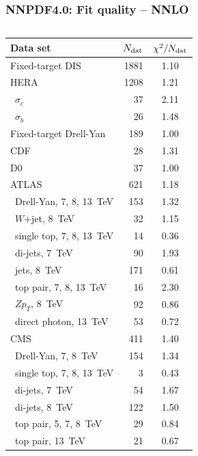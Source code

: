 \documentclass{beamer}
\begin{document}
\begin{frame}
 \frametitle{NNPDF4.0: Fit quality -- NNLO}
 \footnotesize
 \centering
 \begin{columns}[c]
  \begin{column}{0.5\textwidth}
  \tiny
  \renewcommand*{\arraystretch}{1.08}
   \begin{tabularx}{\columnwidth}{Xrc}
   \toprule
   Data set                   & $N_{\rm dat}$ & $\chi^2/N_{\rm dat}$ \\
   \midrule
   Fixed-target DIS           & 1881 & 1.10 \\
   HERA                       & 1208 & 1.21 \\
   \ $\sigma_c$               &   37 & 2.11 \\
   \ $\sigma_b$               &   26 & 1.48 \\
   Fixed-target Drell-Yan     &  189 & 1.00 \\
   CDF                        &   28 & 1.31 \\
   D0                         &   37 & 1.00 \\
   ATLAS                      &  621 & 1.18 \\
   \ Drell-Yan, 7, 8, 13~TeV  &  153 & 1.32 \\
   \ $W$+jet, 8~TeV           &   32 & 1.15 \\
   \ single top, 7, 8, 13~TeV &   14 & 0.36 \\
   \ di-jets, 7~TeV           &   90 & 1.93 \\
   \ jets, 8~TeV              &  171 & 0.61 \\
   \ top pair, 7, 8, 13~TeV   &   16 & 2.30 \\
   \ $Zp_T$, 8~TeV            &   92 & 0.86 \\
   \ direct photon, 13~TeV    &   53 & 0.72 \\
   CMS                        &  411 & 1.40 \\
   \ Drell-Yan, 7, 8~TeV      &  154 & 1.34 \\
   \ single top, 7, 8, 13~TeV &    3 & 0.43 \\
   \ di-jets, 7~TeV           &   54 & 1.67 \\
   \ di-jets, 8~TeV           &  122 & 1.50 \\
   \ top pair, 5, 7, 8~TeV    &   29 & 0.84 \\
   \ top pair, 13~TeV         &   21 & 0.67 \\

\end{tabularx}
\end{column}
\end{columns}
\end{frame}
\end{document}
